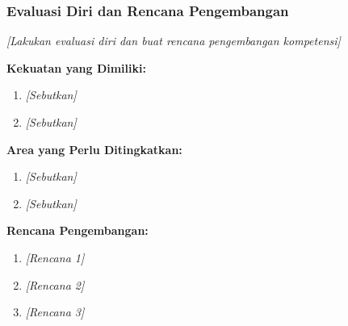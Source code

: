 \vspace{0.5cm}

\subsubsection{Evaluasi Diri dan Rencana Pengembangan}

\textit{[Lakukan evaluasi diri dan buat rencana pengembangan kompetensi]}

\textbf{Kekuatan yang Dimiliki:}
\begin{enumerate}
    \item \textit{[Sebutkan]}
    \item \textit{[Sebutkan]}
\end{enumerate}

\textbf{Area yang Perlu Ditingkatkan:}
\begin{enumerate}
    \item \textit{[Sebutkan]}
    \item \textit{[Sebutkan]}
\end{enumerate}

\textbf{Rencana Pengembangan:}
\begin{enumerate}
    \item \textit{[Rencana 1]}
    \item \textit{[Rencana 2]}
    \item \textit{[Rencana 3]}
\end{enumerate}

